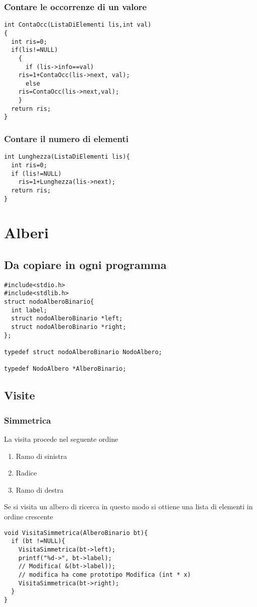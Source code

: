 \documentclass[a4paper,12pt,openany]{book}
\begin{document}
\section{ Contare le occorrenze di un valore}
 \begin{lstlisting}
int ContaOcc(ListaDiElementi lis,int val)
{
  int ris=0;
  if(lis!=NULL)
    {
      if (lis->info==val)
	ris=1+ContaOcc(lis->next, val);
      else
	ris=ContaOcc(lis->next,val);
    }
  return ris;
}
\end{lstlisting}
\newpage


\section{Contare il numero di elementi}
 \begin{lstlisting}
int Lunghezza(ListaDiElementi lis){
  int ris=0;
  if (lis!=NULL)
    ris=1+Lunghezza(lis->next);
  return ris;
}

\end{lstlisting}


\part{Alberi}
\chapter{Da copiare in ogni programma}

 \begin{lstlisting}
#include<stdio.h>
#include<stdlib.h>
struct nodoAlberoBinario{
  int label;
  struct nodoAlberoBinario *left;
  struct nodoAlberoBinario *right;
};

typedef struct nodoAlberoBinario NodoAlbero;

typedef NodoAlbero *AlberoBinario;
  \end{lstlisting}
\chapter{Visite}  
  \section{Simmetrica}
  La visita procede nel seguente ordine 
  \begin{enumerate}
  \item Ramo di sinistra
  \item Radice 
  \item Ramo di destra
  \end{enumerate}
  Se si visita un albero di ricerca in questo modo si ottiene una lista di elementi in ordine crescente
   \begin{lstlisting}
void VisitaSimmetrica(AlberoBinario bt){
  if (bt !=NULL){
    VisitaSimmetrica(bt->left);
    printf("%d->", bt->label);
    // Modifica( &(bt->label)); 
    // modifica ha come prototipo Modifica (int * x)
    VisitaSimmetrica(bt->right);
  }
}   
 \end{lstlisting}
\newpage
\end{document}
